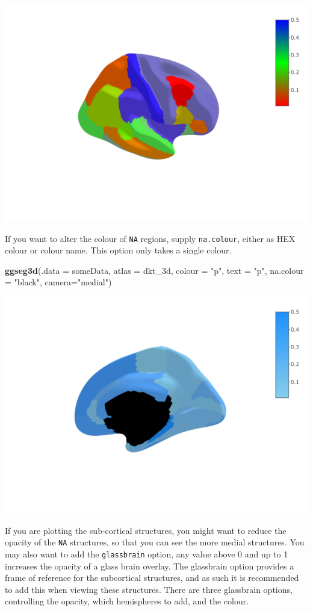 \documentclass[fleqn,10pt]{wlpeerj} %
\newenvironment{Shaded}{\begin{snugshade}}{\end{snugshade}}
\newcommand{\DataTypeTok}[1]{\textcolor[rgb]{0.13,0.29,0.53}{#1}}
\newcommand{\KeywordTok}[1]{\textcolor[rgb]{0.13,0.29,0.53}{\textbf{#1}}}
\newcommand{\NormalTok}[1]{#1}
\newcommand{\StringTok}[1]{\textcolor[rgb]{0.31,0.60,0.02}{#1}}
\begin{document}
\begin{Shaded}
\end{Shaded}

\includegraphics[width=0.4\linewidth]{png/ggseg3d_colour}

If you want to alter the colour of \texttt{NA} regions, supply \texttt{na.colour}, either as HEX colour or colour name.
This option only takes a single colour.

\begin{Shaded}
\begin{Highlighting}[]
  \KeywordTok{ggseg3d}\NormalTok{(}\DataTypeTok{.data =}\NormalTok{ someData, }\DataTypeTok{atlas =}\NormalTok{ dkt_3d, }
          \DataTypeTok{colour =} \StringTok{"p"}\NormalTok{, }\DataTypeTok{text =} \StringTok{"p"}\NormalTok{, }
          \DataTypeTok{na.colour =} \StringTok{"black"}\NormalTok{, }\DataTypeTok{camera=}\StringTok{"medial"}\NormalTok{)}
\end{Highlighting}
\end{Shaded}

\includegraphics[width=0.4\linewidth]{png/ggseg3d_nacolour}

If you are plotting the sub-cortical structures, you might want to reduce the opacity of the \texttt{NA} structures, so that you can see the more medial structures.
You may also want to add the \texttt{glassbrain} option, any value above 0 and up to 1 increases the opacity of a glass brain overlay.
The glassbrain option provides a frame of reference for the subcortical structures, and as such it is recommended to add this when viewing these structures.
There are three glassbrain options, controlling the opacity, which hemispheres to add, and the colour.
\end{document}
